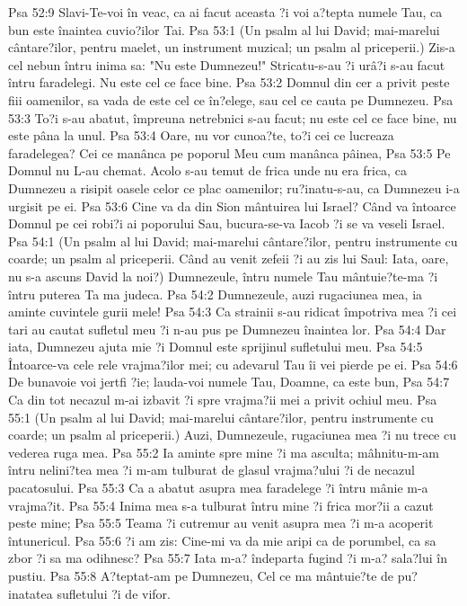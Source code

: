 Psa 52:9  Slavi-Te-voi în veac, ca ai facut aceasta ?i voi a?tepta numele Tau, ca bun este înaintea cuvio?ilor Tai.
Psa 53:1  (Un psalm al lui David; mai-marelui cântare?ilor, pentru maelet, un instrument muzical; un psalm al priceperii.) Zis-a cel nebun întru inima sa: "Nu este Dumnezeu!" Stricatu-s-au ?i urâ?i s-au facut întru faradelegi. Nu este cel ce face bine.
Psa 53:2  Domnul din cer a privit peste fiii oamenilor, sa vada de este cel ce în?elege, sau cel ce cauta pe Dumnezeu.
Psa 53:3  To?i s-au abatut, împreuna netrebnici s-au facut; nu este cel ce face bine, nu este pâna la unul.
Psa 53:4  Oare, nu vor cunoa?te, to?i cei ce lucreaza faradelegea? Cei ce manânca pe poporul Meu cum manânca pâinea,
Psa 53:5  Pe Domnul nu L-au chemat. Acolo s-au temut de frica unde nu era frica, ca Dumnezeu a risipit oasele celor ce plac oamenilor; ru?inatu-s-au, ca Dumnezeu i-a urgisit pe ei.
Psa 53:6  Cine va da din Sion mântuirea lui Israel? Când va întoarce Domnul pe cei robi?i ai poporului Sau, bucura-se-va Iacob ?i se va veseli Israel.
Psa 54:1  (Un psalm al lui David; mai-marelui cântare?ilor, pentru instrumente cu coarde; un psalm al priceperii. Când au venit zefeii ?i au zis lui Saul: Iata, oare, nu s-a ascuns David la noi?) Dumnezeule, întru numele Tau mântuie?te-ma ?i întru puterea Ta ma judeca.
Psa 54:2  Dumnezeule, auzi rugaciunea mea, ia aminte cuvintele gurii mele!
Psa 54:3  Ca strainii s-au ridicat împotriva mea ?i cei tari au cautat sufletul meu ?i n-au pus pe Dumnezeu înaintea lor.
Psa 54:4  Dar iata, Dumnezeu ajuta mie ?i Domnul este sprijinul sufletului meu.
Psa 54:5  Întoarce-va cele rele vrajma?ilor mei; cu adevarul Tau îi vei pierde pe ei.
Psa 54:6  De bunavoie voi jertfi ?ie; lauda-voi numele Tau, Doamne, ca este bun,
Psa 54:7  Ca din tot necazul m-ai izbavit ?i spre vrajma?ii mei a privit ochiul meu.
Psa 55:1  (Un psalm al lui David; mai-marelui cântare?ilor, pentru instrumente cu coarde; un psalm al priceperii.) Auzi, Dumnezeule, rugaciunea mea ?i nu trece cu vederea ruga mea.
Psa 55:2  Ia aminte spre mine ?i ma asculta; mâhnitu-m-am întru nelini?tea mea ?i m-am tulburat de glasul vrajma?ului ?i de necazul pacatosului.
Psa 55:3  Ca a abatut asupra mea faradelege ?i întru mânie m-a vrajma?it.
Psa 55:4  Inima mea s-a tulburat întru mine ?i frica mor?ii a cazut peste mine;
Psa 55:5  Teama ?i cutremur au venit asupra mea ?i m-a acoperit întunericul.
Psa 55:6  ?i am zis: Cine-mi va da mie aripi ca de porumbel, ca sa zbor ?i sa ma odihnesc?
Psa 55:7  Iata m-a? îndeparta fugind ?i m-a? sala?lui în pustiu.
Psa 55:8  A?teptat-am pe Dumnezeu, Cel ce ma mântuie?te de pu?inatatea sufletului ?i de vifor.
